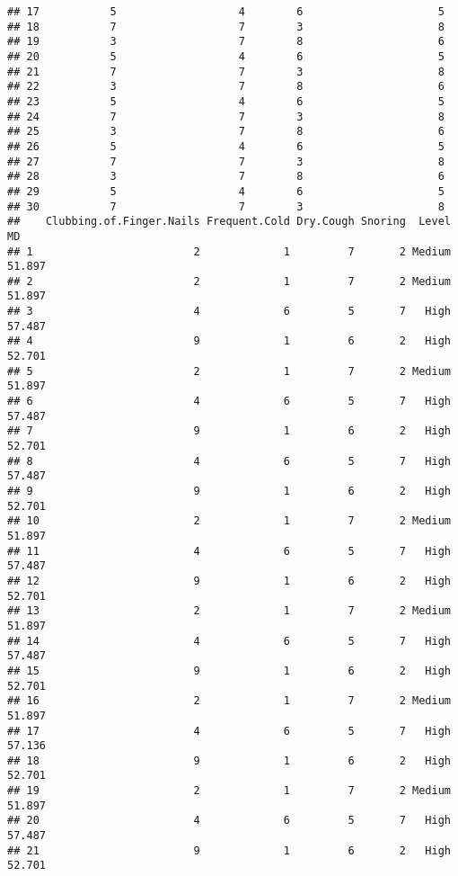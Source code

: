 \documentclass[]{article}
\begin{document}
\begin{verbatim}
## 17           5                   4        6                     5
## 18           7                   7        3                     8
## 19           3                   7        8                     6
## 20           5                   4        6                     5
## 21           7                   7        3                     8
## 22           3                   7        8                     6
## 23           5                   4        6                     5
## 24           7                   7        3                     8
## 25           3                   7        8                     6
## 26           5                   4        6                     5
## 27           7                   7        3                     8
## 28           3                   7        8                     6
## 29           5                   4        6                     5
## 30           7                   7        3                     8
##    Clubbing.of.Finger.Nails Frequent.Cold Dry.Cough Snoring  Level     MD
## 1                         2             1         7       2 Medium 51.897
## 2                         2             1         7       2 Medium 51.897
## 3                         4             6         5       7   High 57.487
## 4                         9             1         6       2   High 52.701
## 5                         2             1         7       2 Medium 51.897
## 6                         4             6         5       7   High 57.487
## 7                         9             1         6       2   High 52.701
## 8                         4             6         5       7   High 57.487
## 9                         9             1         6       2   High 52.701
## 10                        2             1         7       2 Medium 51.897
## 11                        4             6         5       7   High 57.487
## 12                        9             1         6       2   High 52.701
## 13                        2             1         7       2 Medium 51.897
## 14                        4             6         5       7   High 57.487
## 15                        9             1         6       2   High 52.701
## 16                        2             1         7       2 Medium 51.897
## 17                        4             6         5       7   High 57.136
## 18                        9             1         6       2   High 52.701
## 19                        2             1         7       2 Medium 51.897
## 20                        4             6         5       7   High 57.487
## 21                        9             1         6       2   High 52.701

\end{verbatim}
\end{document}
